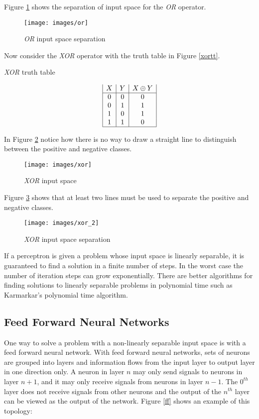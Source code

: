 Figure \ref{ors} shows the separation of input space for the {\it OR} operator.

\begin{figure}[h!]
  \centering
  \texttt{[image: images/or]}
  \caption{{\it OR} input space separation}
  \label{ors}
\end{figure}

Now consider the {\it XOR} operator with the truth table in Figure \ref{xortt}.
\begin{table}[h!]
\caption{{\it XOR} truth table}
\label{xortt}
\begin{displaymath}
\begin{array}{|c|c|c|}
   X
 & Y
 & X \oplus Y
\\
\hline
0 & 0 & 0\\
0 & 1 & 1\\
1 & 0 & 1\\
1 & 1 & 0\\
\hline
\end{array}
\end{displaymath}
\end{table}

In Figure \ref{xors} notice how there is no way to draw a straight line to distinguish between the positive and negative classes.

\begin{figure}[h!]
  \centering
  \texttt{[image: images/xor]}
  \caption{{\it XOR} input space}
  \label{xors}
\end{figure}

Figure \ref{xorss} shows that at least two lines must be used to separate the positive and negative classes.

\begin{figure}[h!]
  \centering
  \texttt{[image: images/xor\_2]}
  \caption{{\it XOR} input space separation}
  \label{xorss}
\end{figure}

If a perceptron is given a problem whose input space is linearly
separable, it is guaranteed to find a solution in a finite number of
steps\cite{patternRecognition1}. 
In the worst case the number of iteration steps can grow
exponentially\cite{rojas2}.
There are better algorithms for finding solutions to linearly separable problems in
polynomial time such as Karmarkar's polynomial time
algorithm\cite{karmarkar}.

\subsection{Feed Forward Neural Networks} 
One way to solve a problem with a non-linearly separable input space
is with a feed forward neural network.
With feed forward neural networks, sets of neurons are grouped into
layers and information flows from the input layer to output layer in one direction only.
A neuron in layer $n$ may only send signals to neurons in layer $n+1$, and it may only receive signals from neurons in layer $n-1$.
The $0^{th}$ layer does not receive signals from other neurons and the output of the $n^{th}$ layer can be viewed as the output of the network.
Figure \ref{ff} shows an example of this topology:

